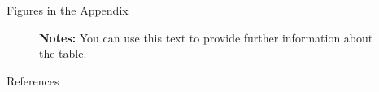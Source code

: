 \documentclass[11pt, aspectratio=169, t]{beamer}
\begin{document}
\begin{frame}{Figures in the Appendix}
\begin{figure}
{\begin{figure}[H]
\begin{minipage}{0.50\linewidth}
\end{minipage}%

\end{figure}%

\vspace{-5pt}
\begin{minipage}{0.9\textwidth}
\scriptsize
\singlespacing
\textbf{Notes:} You can use this text to provide further information about the table. \lipsum[66]
\end{minipage}
\vspace{15pt}

}

\end{figure}%
\end{frame}
\begin{frame}[allowframebreaks]{References}
\small
\printbibliography[heading=none]
\end{frame}
\end{document}
